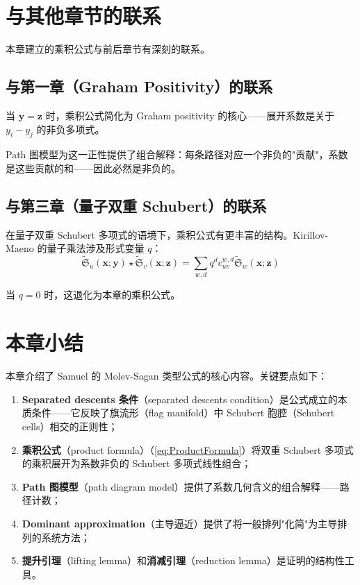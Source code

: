 \section{与其他章节的联系}
\label{sec:Connections}

本章建立的乘积公式与前后章节有深刻的联系。

\subsection{与第一章（Graham Positivity）的联系}

当 $\mathbf{y} = \mathbf{z}$ 时，乘积公式简化为 Graham positivity 的核心——展开系数是关于 $y_i - y_j$ 的非负多项式。

Path 图模型为这一正性提供了组合解释：每条路径对应一个非负的"贡献"，系数是这些贡献的和——因此必然是非负的。

\subsection{与第三章（量子双重 Schubert）的联系}

在量子双重 Schubert 多项式的语境下，乘积公式有更丰富的结构。Kirillov-Maeno 的量子乘法涉及形式变量 $q$：
\[
\widetilde{\mathfrak{S}}_u(\mathbf{x}; \mathbf{y}) \star \widetilde{\mathfrak{S}}_v(\mathbf{x}; \mathbf{z}) = \sum_{w, d} q^d c_{uv}^{w,d} \widetilde{\mathfrak{S}}_w(\mathbf{x}; \mathbf{z})
\]

当 $q = 0$ 时，这退化为本章的乘积公式。

\section{本章小结}
\label{sec:Chapter2Summary}

本章介绍了 Samuel 的 Molev-Sagan 类型公式的核心内容。关键要点如下：

\begin{enumerate}
\item \textbf{Separated descents 条件}（separated descents condition）是公式成立的本质条件——它反映了旗流形（flag manifold）中 Schubert 胞腔（Schubert cells）相交的正则性；
\item \textbf{乘积公式}（product formula）（\cref{eq:ProductFormula}）将双重 Schubert 多项式的乘积展开为系数非负的 Schubert 多项式线性组合；
\item \textbf{Path 图模型}（path diagram model）提供了系数几何含义的组合解释——路径计数；
\item \textbf{Dominant approximation}（主导逼近）提供了将一般排列"化简"为主导排列的系统方法；
\item \textbf{提升引理}（lifting lemma）和\textbf{消减引理}（reduction lemma）是证明的结构性工具。
\end{enumerate}

